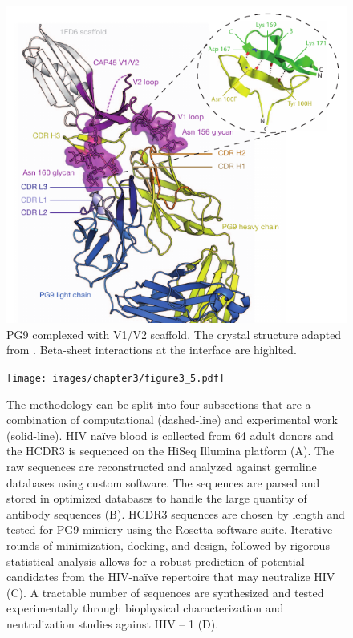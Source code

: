 \begin{figure}
   \centering
   \includegraphics[scale=.8]{images/chapter3/figure3_3.pdf} %
   \caption[PG9 Complexed with V1/V2 Scaffold]{PG9 complexed with V1/V2 scaffold. The crystal structure adapted from \citep{McLellan:2011dg}. Beta-sheet interactions at the interface are highlted.}
   \label{fig:figure3_3}
\end{figure}

\begin{figure}
   \centering
   \texttt{[image: images/chapter3/figure3\_5.pdf]} %
   \caption[Overview of Methodology ]{The methodology can be split into four subsections that are a combination of computational (dashed-line) and experimental work (solid-line). HIV naïve blood is collected from 64 adult donors and the HCDR3 is sequenced on the HiSeq Illumina platform (A). The raw sequences are reconstructed and analyzed against germline databases using custom software. The sequences are parsed and stored in optimized databases to handle the large quantity of antibody sequences (B). HCDR3 sequences are chosen by length and tested for PG9 mimicry using the Rosetta software suite. Iterative rounds of minimization, docking, and design, followed by rigorous statistical analysis allows for a robust prediction of potential candidates from the HIV-naïve repertoire that may neutralize HIV (C). A tractable number of sequences are synthesized and tested experimentally through biophysical characterization and neutralization studies against HIV – 1 (D).}
   \label{fig:figure3_5}
\end{figure}


